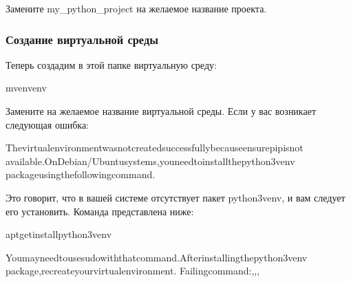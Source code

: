 \documentclass[letterpaper,10pt,russian]{sphinxmanual}
\begin{document}
\sphinxAtStartPar
Замените my\_python\_project на желаемое название проекта.


\subsubsection{Создание виртуальной среды}
\label{\detokenize{educational_materials/path_venv/content:id2}}
\sphinxAtStartPar
Теперь создадим в этой папке виртуальную среду:

\begin{sphinxVerbatim}[commandchars=\\\{\}]
\PYGZhy{}mvenvenv
\end{sphinxVerbatim}

\sphinxAtStartPar
Замените  на желаемое название виртуальной среды. Если у вас возникает следующая ошибка:

\begin{sphinxVerbatim}[commandchars=\\\{\}]
Thevirtualenvironmentwasnotcreatedsuccessfullybecauseensurepipisnot
available.OnDebian/Ubuntusystems,youneedtoinstallthepython3\PYGZhy{}venv
packageusingthefollowingcommand.
\end{sphinxVerbatim}

\sphinxAtStartPar
Это говорит, что в вашей системе отсутствует пакет python3\sphinxhyphen{}venv, и вам следует его установить. Команда представлена ниже:

\begin{sphinxVerbatim}[commandchars=\\\{\}]
apt\PYGZhy{}getinstallpython3\PYGZhy{}venv
\end{sphinxVerbatim}

\begin{sphinxVerbatim}[commandchars=\\\{\}]
Youmayneedtousesudowiththatcommand.Afterinstallingthepython3\PYGZhy{}venv
package,recreateyourvirtualenvironment.
Failingcommand:\PYG{o}{[},,,
\end{sphinxVerbatim}
\end{document}
